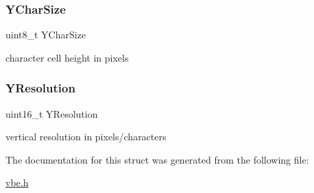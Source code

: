 \subsubsection{\texorpdfstring{Y\+Char\+Size}{YCharSize}}
{\footnotesize\ttfamily uint8\+\_\+t Y\+Char\+Size}



character cell height in pixels 

\hypertarget{structvbe__mode__info__t_afa8aba2156994750d500f85d0f8425cb}{}\label{structvbe__mode__info__t_afa8aba2156994750d500f85d0f8425cb} 
\subsubsection{\texorpdfstring{Y\+Resolution}{YResolution}}
{\footnotesize\ttfamily uint16\+\_\+t Y\+Resolution}



vertical resolution in pixels/characters 



The documentation for this struct was generated from the following file\+:\begin{DoxyCompactItemize}
\item 
\hyperlink{vbe_8h}{vbe.\+h}\end{DoxyCompactItemize}
